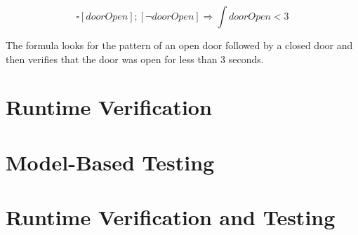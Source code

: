 \documentclass[a4paper, 12pt]{article}
\begin{document}
$$\square [doorOpen] ; [\neg doorOpen] \Rightarrow \int doorOpen < 3$$

The formula looks for the pattern of an open door followed by a closed door and then verifies that the door was open for less than 3 seconds. 

\section{Runtime Verification}

\section{Model-Based Testing}

\section{Runtime Verification and Testing}


 
\end{document}

